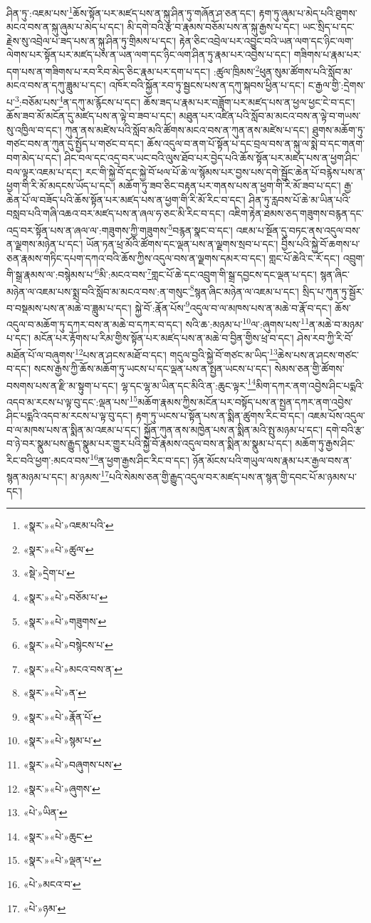 ཤིན་ཏུ་:འཇམ་པས་\footnote{«སྣར་»«པེ་»འཇམ་པའི་}ཆོས་སྟོན་པར་མཛད་པས་ན་སྐུ་ཤིན་ཏུ་གཞོན་ཤ་ཅན་དང་། རྟག་ཏུ་ཞུམ་པ་མེད་པའི་ཐུགས་མངའ་བས་ན་སྐུ་ཞུམ་པ་མེད་པ་དང་། མི་དགེ་བའི་རྩ་བ་རྣམས་བཅོམ་པས་ན་སྐུ་རྒྱས་པ་དང་། ཡང་སྲིད་པ་དང་རྗེས་སུ་འབྲེལ་པ་ཟད་པས་ན་སྐུ་ཤིན་ཏུ་གྲིམས་པ་དང་། རྟེན་ཅིང་འབྲེལ་པར་འབྱུང་བའི་ཡན་ལག་དང་ཉིང་ལག་ལེགས་པར་སྟོན་པར་མཛད་པས་ན་ཡན་ལག་དང་ཉིང་ལག་ཤིན་ཏུ་རྣམ་པར་འབྱེས་པ་དང་། གཟིགས་པ་རྣམ་པར་དག་པས་ན་གཟིགས་པ་རབ་རིབ་མེད་ཅིང་རྣམ་པར་དག་པ་དང་། :ཚུལ་ཁྲིམས་\footnote{«སྣར་»«པེ་»ཚུལ་}ཕུན་སུམ་ཚོགས་པའི་སློབ་མ་མངའ་བས་ན་དཀུ་ཟླུམ་པ་དང་། འཁོར་བའི་སྐྱོན་རབ་ཏུ་སྦྱངས་པས་ན་དཀུ་སྐབས་ཕྱིན་པ་དང་། ང་རྒྱལ་གྱི་:དྲེགས་པ་\footnote{«སྡེ་»དྲེག་པ་}:བཅོམ་པས་\footnote{«སྣར་»«པེ་»བཅོམ་པ་}ན་དཀུ་མ་རྙོངས་པ་དང་། ཆོས་ཟད་པ་རྣམ་པར་བཟློག་པར་མཛད་པས་ན་ཕྱལ་ཕྱང་ངེ་བ་དང་། ཆོས་ཟབ་མོ་མངོན་དུ་མཛད་པས་ན་ལྟེ་བ་ཟབ་པ་དང་། མཐུན་པར་འཛིན་པའི་སློབ་མ་མངའ་བས་ན་ལྟེ་བ་གཡས་སུ་འཁྱིལ་བ་དང་། ཀུན་ནས་མཛེས་པའི་སློབ་མའི་ཚོགས་མངའ་བས་ན་ཀུན་ནས་མཛེས་པ་དང་། ཐུགས་མཆོག་ཏུ་གཙང་བས་ན་ཀུན་དུ་སྤྱོད་པ་གཙང་བ་དང་། ཆོས་འདུལ་བ་ནག་པོ་སྟོན་པ་དང་བྲལ་བས་ན་སྐུ་ལ་སྨེ་བ་དང་གནག་བག་མེད་པ་དང་། ཤིང་བལ་དང་འདྲ་བར་ཡང་བའི་ལུས་ཐོབ་པར་བྱེད་པའི་ཆོས་སྟོན་པར་མཛད་པས་ན་ཕྱག་ཤིང་བལ་ལྟར་འཇམ་པ་དང་། རང་གི་སྐྱེ་བོ་དང་སྐྱེ་བོ་ཕལ་པོ་ཆེ་ལ་སྙོམས་པར་བྱས་པས་དགེ་སྦྱོང་ཆེན་པོ་བརྙེས་པས་ན་ཕྱག་གི་རི་མོ་མདངས་ཡོད་པ་དང་། མཆོག་ཏུ་ཟབ་ཅིང་བརྟན་པར་གནས་པས་ན་ཕྱག་གི་རི་མོ་ཟབ་པ་དང་། རྒྱ་ཆེན་པོ་ལ་བཟོད་པའི་ཆོས་སྟོན་པར་མཛད་པས་ན་ཕྱག་གི་རི་མོ་རིང་བ་དང་། ཤིན་ཏུ་རླབས་པོ་ཆེ་མ་ཡིན་པའི་བསླབ་པའི་གཞི་འཆའ་བར་མཛད་པས་ན་ཞལ་ཧ་ཅང་མི་རིང་བ་དང་། འཇིག་རྟེན་ཐམས་ཅད་གཟུགས་བརྙན་དང་འདྲ་བར་སྟོན་པས་ན་ཞལ་ལ་:གཟུགས་ཀྱི་གཟུགས་\footnote{«སྣར་»«པེ་»གཟུགས་}བརྙན་སྣང་བ་དང་། འཇམ་པ་སྔོན་དུ་བཏང་ནས་འདུལ་བས་ན་ལྗགས་མཉེན་པ་དང་། ཡོན་ཏན་ཕྲ་མོའི་ཚོགས་དང་ལྡན་པས་ན་ལྗགས་སྲབ་པ་དང་། བྱིས་པའི་སྐྱེ་བོ་ཆགས་པ་ཅན་རྣམས་གཏིང་དཔག་དཀའ་བའི་ཆོས་ཀྱིས་འདུལ་བས་ན་ལྗགས་དམར་བ་དང་། གླང་པོ་ཆེའི་ང་རོ་དང་། འབྲུག་གི་སྒྲ་རྣམས་ལ་:བསྙེམས་པ་\footnote{«སྣར་»«པེ་»བསྙེངས་པ་}མི་:མངའ་བས་\footnote{«སྣར་»«པེ་»མངའ་བས་ན་}གླང་པོ་ཆེ་དང་འབྲུག་གི་སྒྲ་དབྱངས་དང་ལྡན་པ་དང་། སྙན་ཞིང་མཉེན་ལ་འཇམ་པས་སྨྲ་བའི་སློབ་མ་མངའ་བས་:ན་གསུང་\footnote{«སྣར་»«པེ་»ན་}སྙན་ཞིང་མཉེན་ལ་འཇམ་པ་དང་། སྲིད་པ་ཀུན་ཏུ་སྦྱོར་བ་བསྡམས་པས་ན་མཆེ་བ་ཟླུམ་པ་དང་། སྐྱེ་བོ་:རྣོན་པོས་\footnote{«སྣར་»«པེ་»རྣོན་པོ་}འདུལ་བ་ལ་མཁས་པས་ན་མཆེ་བ་རྣོ་བ་དང་། ཆོས་འདུལ་བ་མཆོག་ཏུ་དཀར་བས་ན་མཆེ་བ་དཀར་བ་དང་། སའི་ཆ་:མཉམ་པ་\footnote{«སྣར་»«པེ་»སྙམ་པ་}ལ་:ཞུགས་པས་\footnote{«སྣར་»«པེ་»བཞུགས་པས་}ན་མཆེ་བ་མཉམ་པ་དང་། མངོན་པར་རྟོགས་པ་རིམ་གྱིས་སྟོན་པར་མཛད་པས་ན་མཆེ་བ་བྱིན་གྱིས་ཕྲ་བ་དང་། ཤེས་རབ་ཀྱི་རི་བོ་མཐོན་པོ་ལ་བཞུགས་\footnote{«སྣར་»«པེ་»ཞུགས་}པས་ན་ཤངས་མཐོ་བ་དང་། གདུལ་བྱའི་སྐྱེ་བོ་གཙང་མ་ཡིད་\footnote{«པེ་»ཡིན་}ཆེས་པས་ན་ཤངས་གཙང་བ་དང་། སངས་རྒྱས་ཀྱི་ཆོས་མཆོག་ཏུ་ཡངས་པ་དང་ལྡན་པས་ན་སྤྱན་ཡངས་པ་དང་། སེམས་ཅན་གྱི་ཚོགས་བསགས་པས་ན་རྫི་མ་སྟུག་པ་དང་། ལྷ་དང་ལྷ་མ་ཡིན་དང་མིའི་ན་:ཆུང་ལྟར་\footnote{«སྣར་»«པེ་»ཆུང་}མིག་དཀར་ནག་འབྱེས་ཤིང་པདྨའི་འདབ་མ་རངས་པ་ལྟ་བུ་དང་:ལྡན་པས་\footnote{«སྣར་»«པེ་»ལྡན་པ་}མཆོག་རྣམས་ཀྱིས་མངོན་པར་བསྟོད་པས་ན་སྤྱན་དཀར་ནག་འབྱེས་ཤིང་པདྨའི་འདབ་མ་རངས་པ་ལྟ་བུ་དང་། རྟག་ཏུ་ཡངས་པ་སྟོན་པས་ན་སྨིན་ཚུགས་རིང་བ་དང་། འཇམ་པོས་འདུལ་བ་ལ་མཁས་པས་ན་སྨིན་མ་འཇམ་པ་དང་། སྐྱོན་ཀུན་ནས་མཁྱེན་པས་ན་སྨིན་མའི་སྤུ་མཉམ་པ་དང་། དགེ་བའི་རྩ་བ་ཉེ་བར་སྣུམ་པས་རྒྱུད་སྣུམ་པར་གྱུར་པའི་སྐྱེ་བོ་རྣམས་འདུལ་བས་ན་སྨིན་མ་སྣུམ་པ་དང་། མཆོག་ཏུ་རྒྱས་ཤིང་རིང་བའི་ཕྱག་:མངའ་བས་\footnote{«པེ་»མངའ་བ་}ན་ཕྱག་རྒྱས་ཤིང་རིང་བ་དང་། ཉོན་མོངས་པའི་གཡུལ་ལས་རྣམ་པར་རྒྱལ་བས་ན་སྙན་མཉམ་པ་དང་། མ་ཉམས་\footnote{«པེ་»ཉམ་}པའི་སེམས་ཅན་གྱི་རྒྱུད་འདུལ་བར་མཛད་པས་ན་སྙན་གྱི་དབང་པོ་མ་ཉམས་པ་དང་། 